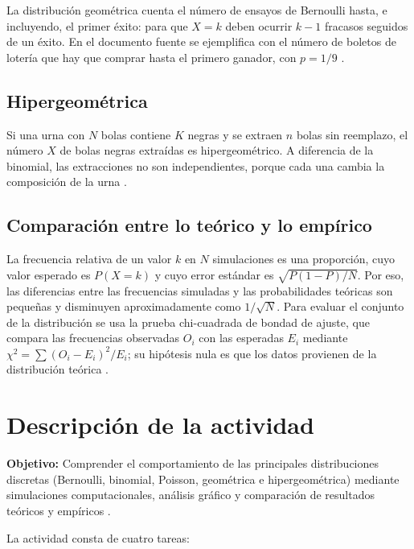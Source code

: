 \documentclass[11pt,letterpaper]{article}
\begin{document}
La distribución geométrica cuenta el número de ensayos de Bernoulli hasta, e incluyendo, el primer éxito: para que $X = k$ deben ocurrir $k - 1$ fracasos seguidos de un éxito. En el documento fuente se ejemplifica con el número de boletos de lotería que hay que comprar hasta el primero ganador, con $p = 1/9$ \parencite{tecnm2026_documento_fuente}.

\subsection{Hipergeométrica}

Si una urna con $N$ bolas contiene $K$ negras y se extraen $n$ bolas sin reemplazo, el número $X$ de bolas negras extraídas es hipergeométrico. A diferencia de la binomial, las extracciones no son independientes, porque cada una cambia la composición de la urna \parencite{tecnm2026_documento_fuente}.

\subsection{Comparación entre lo teórico y lo empírico}

La frecuencia relativa de un valor $k$ en $N$ simulaciones es una proporción, cuyo valor esperado es $P(X = k)$ y cuyo error estándar es $\sqrt{P(1 - P)/N}$. Por eso, las diferencias entre las frecuencias simuladas y las probabilidades teóricas son pequeñas y disminuyen aproximadamente como $1/\sqrt{N}$. Para evaluar el conjunto de la distribución se usa la prueba chi-cuadrada de bondad de ajuste, que compara las frecuencias observadas $O_i$ con las esperadas $E_i$ mediante $\chi^2 = \sum (O_i - E_i)^2/E_i$; su hipótesis nula es que los datos provienen de la distribución teórica \parencite{tecnm2026_documento_fuente,rice2006}.

\section{Descripción de la actividad}

\textbf{Objetivo:} Comprender el comportamiento de las principales distribuciones discretas (Bernoulli, binomial, Poisson, geométrica e hipergeométrica) mediante simulaciones computacionales, análisis gráfico y comparación de resultados teóricos y empíricos \parencite{tecnm2026_documento_fuente}.

La actividad consta de cuatro tareas:
\end{document}
